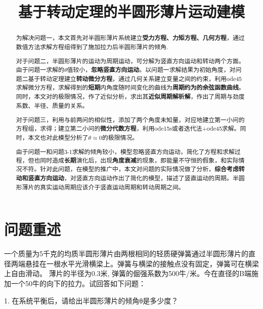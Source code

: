 \documentclass[withoutpreface,bwprint]{cumcmthesis} %
\title{基于转动定理的半圆形薄片运动建模}
\begin{document}
	
	\maketitle


	\begin{abstract}
		 为解决问题一，本文首先对半圆形薄片系统建立\textbf{受力方程、力矩方程、几何方程}，通过数值方法求解方程组得到了施加拉力后半圆形薄片的倾角.
		 
		 
		 对于问题二，半圆形薄片的运动为周期运动，可分解为竖直方向运动和转动两个方面。由于问题一求解的$\theta$值较小，\textbf{忽略竖直方向运动}。以问题一求解结果为初始角度，对问题二基于转动定理建立\textbf{转动微分方程}，通过几何关系建立变量之间的约束，利用ode45求解微分方程，求解得到的\textbf{短期}内角度随时间变化的曲线为\textbf{周期约为的余弦函数曲线}。同时，本文对的极限情况，作了近似分析，求出其\textbf{近似周期解析解}，作出了周期与劲度系数、半径、质量的关系。
		
		对于问题三，利用与前两问的相似性，添加了两个角度未知量，对应地建立第一小问的方程组，求得；建立第二小问的\textbf{微分代数方程}，利用ode15s或者迭代法+ode45求解。同时，本文也对此模型分析了$\theta \approx 0$的极限情况。
		
		由于问题一和问题3-1求解的倾角较小，模型忽略竖直方向运动，简化了方程和求解过程，但也同时造成\textbf{长期}演化后，出现\textbf{角度衰减}的现象，即能量不守恒的假象，和实际情况不符。针对此问题，在模型的推广中，本文对问题的实际情况做了分析，\textbf{综合考虑转动和竖直方向运动}，对竖直方向运动作出了简化的模型，描述了竖直运动的周期。半圆形薄片的真实运动周期应该介于竖直运动周期和转动周期之间。
		
	\end{abstract}
	
	\tableofcontents
	
	\newpage
	
	\section{问题重述}
	一个质量为5千克的均质半圆形薄片由两根相同的轻质硬弹簧通过半圆形薄片的直径两端悬挂在一根水平光滑横梁上。弹簧与横梁的接触点没有固定，弹簧可在横梁上自由滑动。
	薄片的半径为0.3米, 弹簧的倔强系数为500牛/米。今在直径的B端施加一个50牛的向下的拉力。试回答如下问题：
	
	1.	在系统平衡后，请给出半圆形薄片的倾角θ是多少度？
	
\end{document}
